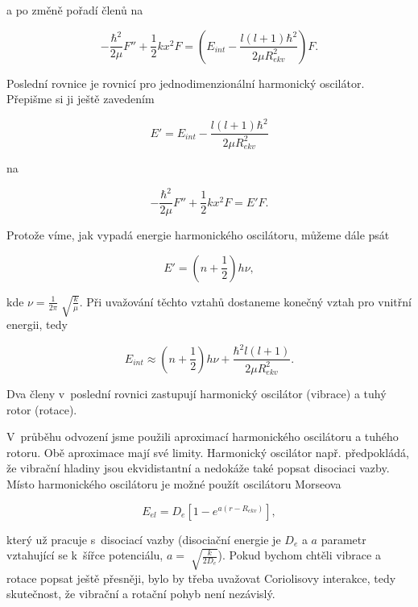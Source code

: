 \noindent a po změně pořadí členů na 

\begin{equation}
-\frac{\hbar^2}{2\mu}F''+\frac{1}{2}kx^2F=\left(E_{int}-\frac{l\left(l+1\right)\hbar^2}{2\mu R_{ekv}^2}\right)F. 
\label{vibrot:vibrot5}
\end{equation}

\noindent Poslední rovnice je rovnicí pro jednodimenzionální harmonický oscilátor. Přepišme si ji ještě zavedením

\begin{displaymath}
E'=E_{int}-\frac{l\left(l+1\right)\hbar^2}{2\mu R_{ekv}^2}
\end{displaymath}

\noindent na

\begin{equation}
-\frac{\hbar^2}{2\mu}F''+\frac{1}{2}kx^2F=E'F. 
\label{vibrot:vibrot6}
\end{equation}

Protože víme, jak vypadá energie harmonického oscilátoru, můžeme dále psát

\begin{equation}
E'=\left(n+\frac{1}{2}\right)h\nu,
\end{equation}

\noindent kde $\nu=\frac{1}{2\pi}\sqrt[]{\frac{k}{\mu}}$. Při uvažování těchto vztahů dostaneme konečný vztah pro vnitřní energii, tedy

\begin{equation}
E_{int}\approx \left(n+\frac{1}{2}\right) h\nu+\frac{\hbar^2l(l+1)}{2\mu R_{ekv}^2}.
\end{equation}

\noindent Dva členy v~poslední rovnici zastupují harmonický oscilátor (vibrace) a tuhý rotor (rotace). 

\noindent V~průběhu odvození jsme použili aproximací harmonického oscilátoru a tuhého rotoru. Obě aproximace mají své limity. Harmonický oscilátor např. předpokládá, že vibrační hladiny jsou ekvidistantní a nedokáže také popsat disociaci vazby. Místo harmonického oscilátoru je možné použít oscilátoru Morseova

\begin{equation}
E_{el}=D_e\left[1-e^{a(r-R_{ekv})}\right],
\end{equation}

\noindent který už pracuje s~disociací vazby (disociační energie je $D_e$ a $a$ parametr vztahující se k~šířce potenciálu, $a=\sqrt[]{\frac{k}{2D_e}}$).
\noindent Pokud bychom chtěli vibrace a rotace popsat ještě přesněji, bylo by třeba uvažovat Coriolisovy interakce, tedy skutečnost, že vibrační a rotační pohyb není nezávislý.









